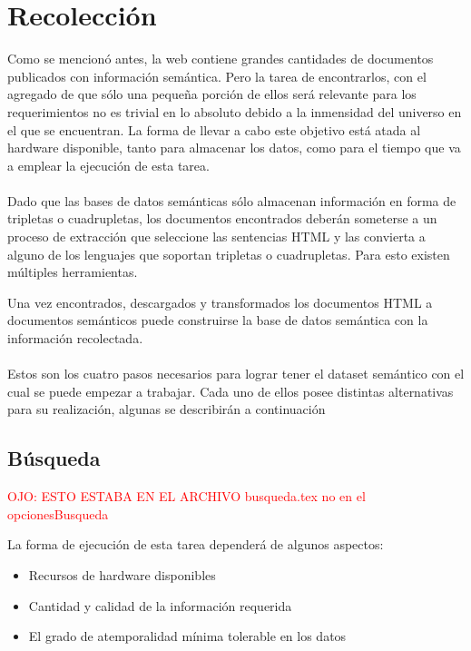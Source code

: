 \section{Recolección}
\label{section:recoleccion}
%
Como se mencionó antes, la web contiene grandes cantidades de documentos publicados con información semántica. Pero la tarea
de encontrarlos, con el agregado de que sólo una pequeña porción de ellos será relevante para los requerimientos no es trivial
en lo absoluto debido a la inmensidad del universo en el que se encuentran. La forma de llevar a cabo este objetivo está 
atada al hardware disponible, tanto para almacenar los datos, como para el tiempo que va a emplear la ejecución de esta 
tarea.  
\\\\
Dado que las bases de datos semánticas sólo almacenan información en forma de tripletas o cuadrupletas, los documentos encontrados 
deberán someterse a un proceso de extracción que seleccione las sentencias HTML y las convierta a alguno de los lenguajes que soportan  
tripletas o cuadrupletas. Para esto existen múltiples herramientas. 

Una vez encontrados, descargados y transformados los documentos HTML a documentos semánticos puede construirse la base de datos semántica 
con la información recolectada. 
\\\\
Estos son los cuatro pasos necesarios para lograr tener el dataset semántico con el cual se puede empezar a trabajar. Cada uno de ellos 
posee distintas alternativas para su realización, algunas se describirán a continuación 



\subsection{Búsqueda}
%
\textcolor{red}{OJO: ESTO ESTABA EN EL ARCHIVO busqueda.tex no en el opcionesBusqueda}


La forma de ejecución de esta tarea dependerá de algunos aspectos:
\begin{itemize}
\item Recursos de hardware disponibles

\item Cantidad y calidad de la información requerida

\item El grado de atemporalidad mínima tolerable en los datos

\end{itemize}

